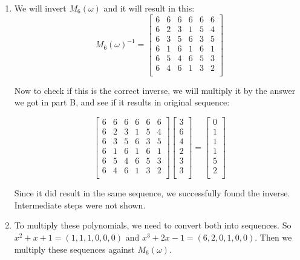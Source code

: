 \documentclass[11pt]{article}
\newenvironment{qparts}{\begin{enumerate}[{(}a{)}]}{\end{enumerate}}
\begin{document}
\begin{qparts}
All of the intermediate steps are not shown. The resulting matrix is our answer.

\item We will invert $M_6(\omega)$ and it will result in this:
\[M_6(\omega)^{-1} =
\begin{bmatrix}
    6       & 6 & 6 & 6 & 6 & 6 \\
    6       & 2 & 3 & 1 & 5 & 4 \\
    6       & 3 & 5 & 6 & 3 & 5 \\
    6       & 1 & 6 & 1 & 6 & 1 \\
    6       & 5 & 4 & 6 & 5 & 3 \\
    6       & 4 & 6 & 1 & 3 & 2 \\
\end{bmatrix}
\]

Now to check if this is the correct inverse, we will multiply it by the answer we got in part B, and see if it results in original sequence:

\[
\begin{bmatrix}
    6       & 6 & 6 & 6 & 6 & 6 \\
    6       & 2 & 3 & 1 & 5 & 4 \\
    6       & 3 & 5 & 6 & 3 & 5 \\
    6       & 1 & 6 & 1 & 6 & 1 \\
    6       & 5 & 4 & 6 & 5 & 3 \\
    6       & 4 & 6 & 1 & 3 & 2 \\
\end{bmatrix}
\begin{bmatrix}
3 \\
6 \\
4 \\
2 \\
3 \\
3 \\
\end{bmatrix} =
\begin{bmatrix}
0 \\
1 \\
1 \\
1 \\
5 \\
2 \\
\end{bmatrix}
\]  

Since it did result in the same sequence, we successfully found the inverse. Intermediate steps were not shown.

\item To multiply these polynomials, we need to convert both into sequences. So $x^2+ x + 1 = (1, 1, 1, 0, 0, 0)$ and $x^3 + 2x - 1 = (6, 2, 0, 1, 0, 0)$. Then we multiply these sequences against $M_6(\omega)$. 


\end{qparts}
\end{document}
